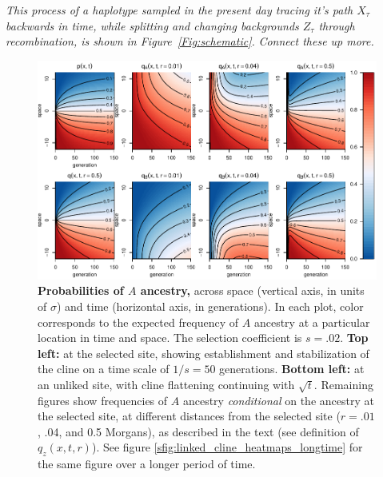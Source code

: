 \documentclass[11pt,letterpaper]{article}
\newcommand{\alisa}[1]{{\em \color{red} #1}}
\newcommand{\plr}[1]{{\em \color{blue} #1}}
\begin{document}
\alisa{This process of a haplotype sampled in the present day tracing it's path $X_\tau$ backwards in time, while splitting and changing backgrounds $Z_\tau$ through recombination, is shown in Figure~\ref{Fig:schematic}.}
\plr{Connect these up more.}


\begin{figure}
    \includegraphics{figs/linked-frequencies}
    \caption{
        \textbf{Probabilities of $A$ ancestry,}
        across space (vertical axis, in units of $\sigma$) 
        and time (horizontal axis, in generations).
        In each plot, color corresponds to the expected frequency of $A$ ancestry
        at a particular location in time and space.
        The selection coefficient is $s=.02$.
        \textbf{Top left:} at the selected site, showing establishment and stabilization of the cline
        on a time scale of $1/s=50$ generations.
        \textbf{Bottom left:} at an unliked site,
        with cline flattening continuing with $\sqrt{t}$.
        Remaining figures show frequencies of $A$ ancestry \emph{conditional}
        on the ancestry at the selected site,
        at different distances from the selected site ($r=.01$, .04, and 0.5 Morgans),
        as described in the text (see definition of $q_z(x,t,r)$).
        See figure \ref{sfig:linked_cline_heatmaps_longtime}
        for the same figure over a longer period of time.
    }
    \label{fig:linked_cline_heatmaps}
\end{figure}
\end{document}
